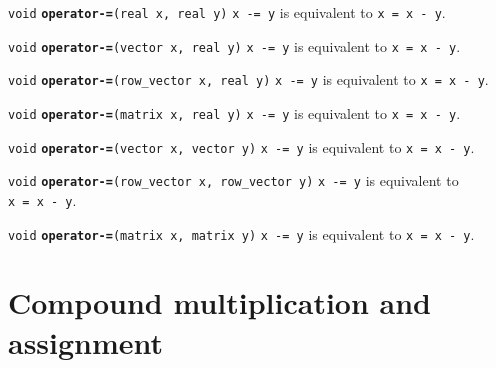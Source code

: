 \documentclass[
  10pt,
]{book}
\begin{document}

\texttt{void} \textbf{\texttt{operator-=}}\texttt{(real\ x,\ real\ y)}\newline
\texttt{x\ -=\ y} is equivalent to \texttt{x\ =\ x\ -\ y}.


\texttt{void} \textbf{\texttt{operator-=}}\texttt{(vector\ x,\ real\ y)}\newline
\texttt{x\ -=\ y} is equivalent to \texttt{x\ =\ x\ -\ y}.


\texttt{void} \textbf{\texttt{operator-=}}\texttt{(row\_vector\ x,\ real\ y)}\newline
\texttt{x\ -=\ y} is equivalent to \texttt{x\ =\ x\ -\ y}.


\texttt{void} \textbf{\texttt{operator-=}}\texttt{(matrix\ x,\ real\ y)}\newline
\texttt{x\ -=\ y} is equivalent to \texttt{x\ =\ x\ -\ y}.


\texttt{void} \textbf{\texttt{operator-=}}\texttt{(vector\ x,\ vector\ y)}\newline
\texttt{x\ -=\ y} is equivalent to \texttt{x\ =\ x\ -\ y}.


\texttt{void} \textbf{\texttt{operator-=}}\texttt{(row\_vector\ x,\ row\_vector\ y)}\newline
\texttt{x\ -=\ y} is equivalent to \texttt{x\ =\ x\ -\ y}.


\texttt{void} \textbf{\texttt{operator-=}}\texttt{(matrix\ x,\ matrix\ y)}\newline
\texttt{x\ -=\ y} is equivalent to \texttt{x\ =\ x\ -\ y}.

\hypertarget{compound-multiplication-and-assignment}{%
\section{Compound multiplication and assignment}\label{compound-multiplication-and-assignment}}
\end{document}
